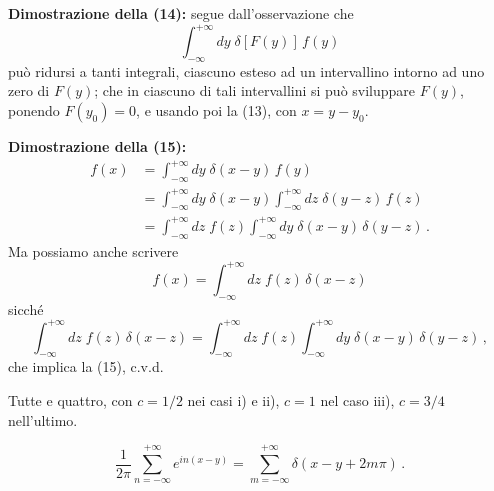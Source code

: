 \documentclass[11pt, a4paper]{book}
\numberwithin{equation}{section}
\begin{document}
\begin{description}
\textbf{Dimostrazione della (14):} segue dall'osservazione che
\[
  \int_{-\infty}^{+\infty} dy\;\delta[F(y)]\,f(y)
\]
può ridursi a tanti integrali, ciascuno esteso ad un intervallino intorno ad uno zero di $F(y)$; che in ciascuno di tali intervallini si può sviluppare $F(y)$, ponendo $F(y_0)=0$, e usando poi la (13), con $x=y-y_0$.

\textbf{Dimostrazione della (15):}
\begin{align*}
  f(x) &= \int_{-\infty}^{+\infty} dy\;\delta(x-y)\,f(y)\\
  &= \int_{-\infty}^{+\infty} dy\;\delta(x-y)\int_{-\infty}^{+\infty} dz\;\delta(y-z)\,f(z)\\
  &= \int_{-\infty}^{+\infty} dz\;f(z)\int_{-\infty}^{+\infty} dy\;\delta(x-y)\,\delta(y-z)\,.
\end{align*}
Ma possiamo anche scrivere
\[
  f(x) = \int_{-\infty}^{+\infty} dz\;f(z)\,\delta(x-z)
\]
sicché
\[
  \int_{-\infty}^{+\infty} dz\;f(z)\,\delta(x-z)
  = \int_{-\infty}^{+\infty} dz\;f(z)\int_{-\infty}^{+\infty} dy\;\delta(x-y)\,\delta(y-z)\,,
\]
che implica la (15), c.v.d.

\item[4.3] Tutte e quattro, con $c=1/2$ nei casi i) e ii), $c=1$ nel caso iii), $c=3/4$ nell'ultimo.

\item[4.4]
\[
  \frac{1}{2\pi}\sum_{n=-\infty}^{+\infty}e^{in(x-y)} = \sum_{m=-\infty}^{+\infty}\delta(x-y+2m\pi)\,.
\]


\end{description}
\end{document}
